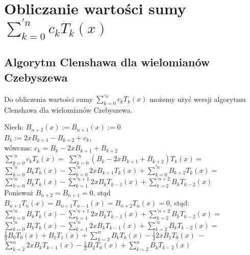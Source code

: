 \documentclass[10pt]{article}
\begin{document}
\section{Obliczanie wartości sumy $\sum_{k=0}^{'n} c_{k} T_{k}(x)$}
\subsection{Algorytm Clenshawa dla wielomianów Czebyszewa}
Do obliczenia wartości sumy $\sum_{k=0}^{'n} c_{k} T_{k}(x)$ możemy użyć wersji algorytmu Clenshawa dla wielomianów Czebyszewa.
\begin{center}
Niech: 
$B_{n+2}(x) := B_{n+1}(x) := 0$ \\
\vspace{0.2em} $B_{k} := 2x B_{k+1} - B_{k+2} + c_{k}$, \\ 
wówczas:
$c_{k} = B_{k} - 2x B_{k+1} + B_{k+2}$ \\
\vspace{0.2em} $\sum_{k=0}^{'n} c_{k} T_{k}(x) =$
$\sum_{k=0}^{'n} (B_{k} - 2x B_{k+1} + B_{k+2}) T_{k}(x) = $ \\
\vspace{0.2em} $\sum_{k=0}^{'n} B_{k} T_{k}(x) - \sum_{k=0}^{'n} 2x B_{k+1} T_{k}(x) + \sum_{k=0}^{'n} B_{k+2} T_{k}(x) =$ \\
\vspace{0.2em} $\sum_{k=0}^{'n} B_{k} T_{k}(x) - \sum_{k=1}^{'n+1} 2x B_{k} T_{k-1}(x) + \sum_{k=2}^{'n+2} B_{k} T_{k-2}(x)$ \\
\vspace{0.2em} Ponieważ $B_{n+2} = B_{n+1} = 0$, stąd \\
\vspace{0.2em} $B_{n+1} T_{n}(x) = B_{n+1} T_{n-1}(x) = B_{n+2} T_{n}(x) = 0$, stąd: \\
\vspace{0.2em} $\sum_{k=0}^{'n} B_{k} T_{k}(x) - \sum_{k=1}^{'n+1} 2x B_{k} T_{k-1}(x) + \sum_{k=2}^{'n+2} B_{k} T_{k-2}(x) =$ \\
\vspace{0.3em} $\sum_{k=0}^{'n} B_{k} T_{k}(x) - \sum_{k=1}^{'n} 2x B_{k} T_{k-1}(x) + \sum_{k=2}^{'n} B_{k} T_{k-2}(x) =$ \\
\vspace{0.3em} $\frac{1}{2} B_{0} T_{0}(x) + B_{1} T_{1}(x) + \sum_{k=2}^{n} B_{k} T_{k}(x) - \frac{1}{2} 2x B_{1} T_{0}(x) \: -$\\
\vspace{0.3em}$\sum_{k=2}^{n} 2x B_{k} T_{k-1}(x) - \frac{1}{2} B_{2} T_{0}(x) + \sum_{k=2}^{n} B_{k} T_{k-2}(x) $


\end{center}
\end{document}
